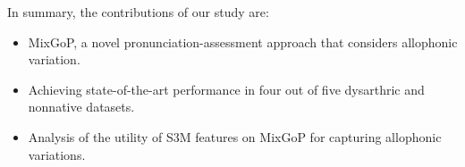 In summary, the contributions of our study are:
\begin{itemize}
    \item MixGoP, a novel pronunciation-assessment approach that considers allophonic variation.
    \item Achieving state-of-the-art performance in four out of five dysarthric and nonnative datasets.
    \item Analysis of the utility of S3M features on MixGoP for capturing allophonic variations.
\end{itemize}
